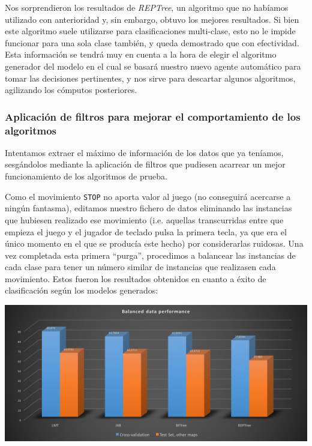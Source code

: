 \documentclass[12pt]{article}
\begin{document}
\vspace{0.3cm}

Nos sorprendieron los resultados de \emph{REPTree}, un algoritmo que no habíamos utilizado con anterioridad y, sin embargo, obtuvo los mejores resultados. Si bien este algoritmo suele utilizarse para clasificaciones multi-clase, esto no le impide funcionar para una sola clase también, y queda demostrado que con efectividad. Esta información se tendrá muy en cuenta a la hora de elegir el algoritmo generador del modelo en el cual se basará nuestro nuevo agente automático para tomar las decisiones pertinentes, y nos sirve para descartar algunos algoritmos, agilizando los cómputos posteriores.

\subsubsection{Aplicación de filtros para mejorar el comportamiento de los algoritmos}

Intentamos extraer el máximo de información de los datos que ya teníamos, sesgándolos mediante la aplicación de filtros que pudiesen acarrear un mejor funcionamiento de los algoritmos de prueba.

Como el movimiento \texttt{STOP} no aporta valor al juego (no conseguirá acercarse a ningún fantasma), editamos nuestro fichero de datos eliminando las instancias que hubiesen realizado ese movimiento (i.e. aquellas transcurridas entre que empieza el juego y el jugador de teclado pulsa la primera tecla, ya que era el único momento en el que se producía este hecho) por considerarlas ruidosas. Una vez completada esta primera ``purga'', procedimos a balancear las instancias de cada clase para tener un número similar de instancias que realizasen cada movimiento. Estos fueron los resultados obtenidos en cuanto a éxito de clasificación según los modelos generados:

\vspace{0.3cm}

\noindent \includegraphics[width=\textwidth]{balanced_performance}
\end{document}
